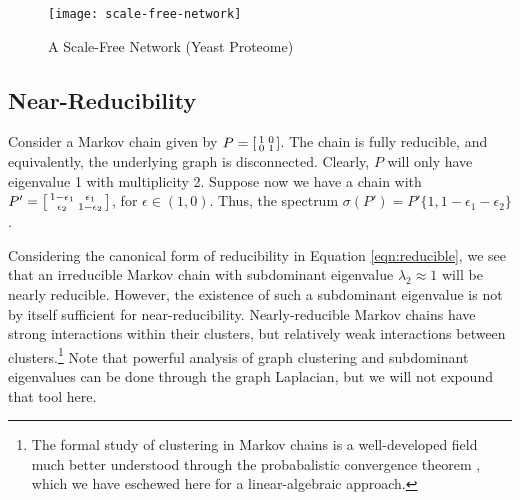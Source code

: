 \documentclass[../exploring-pagerank.tex]{subfiles}
\begin{document}
    \begin{figure}
        \centering
        \texttt{[image: scale-free-network]}
        \caption{A Scale-Free Network (Yeast Proteome) \cite{wangKineticConformationalCharacterization}}
        \label{fig:scale-free}
    \end{figure}
    \subsection{Near-Reducibility}
    Consider a Markov chain given by $P=\begin{bsmallmatrix} 1 & 0 \\ 0 & 1 \end{bsmallmatrix}$. The chain is fully reducible, and equivalently, the underlying graph is disconnected. Clearly, $P$ will only have eigenvalue 1 with multiplicity 2. Suppose now we have a chain with $P'=\begin{bsmallmatrix} 1 - \epsilon_1  & \epsilon_1 \\ \epsilon_2 & 1 - \epsilon_2 \end{bsmallmatrix}$, for $\epsilon \in (1,0)$. Thus, the spectrum $\sigma(P') =P' \{ 1, 1-\epsilon_1 - \epsilon_2 \}$. 
    
    Considering the canonical form of reducibility in Equation \eqref{eqn:reducible}, we see that an irreducible Markov chain with subdominant eigenvalue $\lambda_2 \approx 1$ will be nearly reducible. However, the existence of such a subdominant eigenvalue is not by itself sufficient for near-reducibility. Nearly-reducible Markov chains have strong interactions within their clusters, but relatively weak interactions between clusters.\footnote{The formal study of clustering in Markov chains is a well-developed field much better understood through the probabalistic convergence theorem , which we have eschewed here for a linear-algebraic approach.} Note that powerful analysis of graph clustering and subdominant eigenvalues can be done through the graph Laplacian, but we will not expound that tool here.
    
\end{document}
